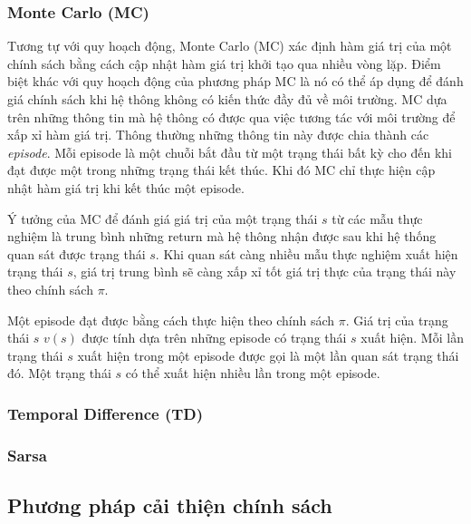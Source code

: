 		\subsubsection*{Monte Carlo (MC)}
		Tương tự với quy hoạch động, Monte Carlo (MC) xác định hàm giá trị của một chính sách bằng cách cập nhật hàm giá trị khởi tạo qua nhiều vòng lặp. Điểm biệt khác với quy hoạch động của phương pháp MC là nó có thể áp dụng để đánh giá chính sách khi hệ thông không có kiến thức đầy đủ về môi trường. MC dựa trên những thông tin mà hệ thông có được qua việc tương tác với môi trường để xấp xỉ hàm giá trị. Thông thường những thông tin này được chia thành các \textit{episode}. Mỗi episode là một chuỗi bắt đầu từ một trạng thái bất kỳ cho đến khi đạt được một trong những trạng thái kết thúc. Khi đó MC chỉ thực hiện cập nhật hàm giá trị khi kết thúc một episode.
		
		Ý tưởng của MC để đánh giá giá trị của một trạng thái $s$ từ các mẫu thực nghiệm là trung bình những return mà hệ thông nhận được sau khi hệ thống quan sát được trạng thái $s$. Khi quan sát càng nhiều mẫu thực nghiệm xuất hiện trạng thái $s$, giá trị trung bình sẽ càng xấp xỉ tốt giá trị thực của trạng thái này theo chính sách $\pi$.
		
		Một episode đạt được bằng cách thực hiện theo chính sách $\pi$. Giá trị của trạng thái $s$ $v(s)$ được tính dựa trên những episode có trạng thái $s$ xuất hiện. Mỗi lần trạng thái $s$ xuất hiện trong một episode được gọi là một lần quan sát trạng thái đó. Một trạng thái $s$ có thể xuất hiện nhiều lần trong một episode.
		 
		\subsubsection*{Temporal Difference (TD)}
		
		\subsubsection*{Sarsa}
	
	\subsection{Phương pháp cải thiện chính sách}
